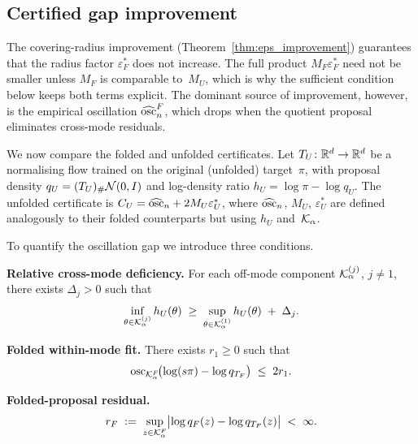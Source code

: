 \subsection{Certified gap improvement}
\label{sec:gap_improvement}

The covering-radius improvement (Theorem~\ref{thm:eps_improvement})
guarantees that the radius factor $\varepsilon_F^*$ does not
increase.  The full product $M_F\varepsilon_F^*$ need not be
smaller unless $M_F$ is comparable to~$M_U$, which is why the
sufficient condition below keeps both terms explicit.
The dominant source of improvement, however, is the empirical
oscillation $\widehat{\mathrm{osc}}_n^F$, which drops when the quotient
proposal eliminates cross-mode residuals.

We now compare the folded and unfolded certificates.
Let $T_U\colon \mathbb{R}^d \to \mathbb{R}^d$ be a normalising flow trained on the
original (unfolded) target~$\pi$, with proposal density
$q_U = (T_U)_{\#}\mathcal{N}(0,I)$ and log-density ratio
$h_U = \log\pi - \log q_U$.
The unfolded certificate is
$C_U = \widehat{\mathrm{osc}}_n + 2 M_U \varepsilon_U^*$, where
$\widehat{\mathrm{osc}}_n$, $M_U$, $\varepsilon_U^*$ are defined
analogously to their folded counterparts but using $h_U$
and~$\mathcal{K}_\alpha$.

To quantify the oscillation gap we introduce three conditions.

\begin{description}[leftmargin=1.5em,nosep]
  \item[(M\,$'$)]
  \textbf{Relative cross-mode deficiency.}
  For each off-mode component $\mathcal{K}_\alpha^{(j)}$, $j \neq 1$,
  there exists $\Delta_j > 0$ such that
  \begin{equation}\label{eq:cond_M}
    \inf_{\theta \in \mathcal{K}_\alpha^{(j)}} h_U(\theta)
    \;\geq\;
    \sup_{\theta \in \mathcal{K}_\alpha^{(1)}} h_U(\theta)
    \;+\; \Delta_j.
  \end{equation}

  \item[(W)]
  \textbf{Folded within-mode fit.}
  There exists $r_1 \geq 0$ such that
  \begin{equation}\label{eq:cond_W}
    \mathrm{osc}_{\mathcal{K}_\alpha^F}\!\bigl(\log(s\pi) - \log q_{T_F}\bigr)
    \;\leq\; 2r_1.
  \end{equation}

  \item[(R)]
  \textbf{Folded-proposal residual.}
  \begin{equation}\label{eq:cond_R}
    r_F \;:=\;
    \sup_{z \in \mathcal{K}_\alpha^F}
    \bigl|\log q_F(z) - \log q_{T_F}(z)\bigr|
    \;<\; \infty.
  \end{equation}
\end{description}

